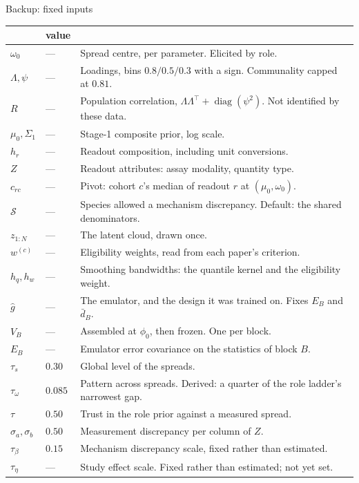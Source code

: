 \documentclass[10pt,aspectratio=169]{beamer}
\newcommand{\Tr}{^{\!\top}}
\DeclareMathOperator{\diag}{diag}
\begin{document}
\begin{frame}[t]{Backup: fixed inputs}
  \begin{center}\tiny
  \begin{tabularx}{\textwidth}{@{}llX@{}}
    \toprule
    & \textbf{value} & \\
    \midrule
    $\omega_0$ & --- & Spread centre, per parameter. Elicited by role. \\
    $\Lambda,\psi$ & --- & Loadings, bins $0.8/0.5/0.3$ with a sign. Communality capped at $0.81$. \\
    $R$ & --- & Population correlation, $\Lambda\Lambda\Tr+\diag(\psi^2)$. Not identified by these data. \\
    $\mu_0,\Sigma_1$ & --- & Stage-1 composite prior, log scale. \\
    $h_r$ & --- & Readout composition, including unit conversions. \\
    $Z$ & --- & Readout attributes: assay modality, quantity type. \\
    $c_{rc}$ & --- & Pivot: cohort $c$'s median of readout $r$ at $(\mu_0,\omega_0)$. \\
    $\mathcal{S}$ & --- & Species allowed a mechanism discrepancy. Default: the shared denominators. \\
    $z_{1:N}$ & --- & The latent cloud, drawn once. \\
    $w^{(c)}$ & --- & Eligibility weights, read from each paper's criterion. \\
    $h_q,h_w$ & --- & Smoothing bandwidths: the quantile kernel and the eligibility weight. \\
    $\widehat g$ & --- & The emulator, and the design it was trained on. Fixes $E_B$ and $\bar d_B$. \\
    $V_B$ & --- & Assembled at $\phi_0$, then frozen. One per block. \\
    $E_B$ & --- & Emulator error covariance on the statistics of block $B$. \\
    \midrule
    $\tau_s$ & $0.30$ & Global level of the spreads. \\
    $\tau_\omega$ & $0.085$ & Pattern across spreads. Derived: a quarter of the role ladder's narrowest gap. \\
    $\tau$ & $0.50$ & Trust in the role prior against a measured spread. \\
    $\sigma_a,\sigma_b$ & $0.50$ & Measurement discrepancy per column of $Z$. \\
    $\tau_\beta$ & $0.15$ & Mechanism discrepancy scale, fixed rather than estimated. \\
    $\tau_\eta$ & --- & Study effect scale. Fixed rather than estimated; not yet set. \\
    \bottomrule
  \end{tabularx}
  \end{center}
\end{frame}
\end{document}

